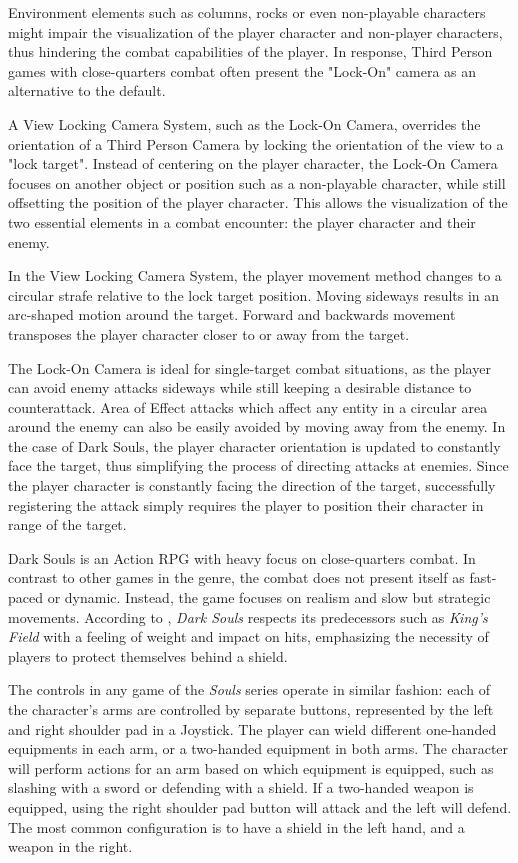 Environment elements such as columns, rocks or even non-playable characters might impair the visualization of the player character and non-player characters, thus hindering the combat capabilities of the player. In response, Third Person games with close-quarters combat often present the "Lock-On" camera as an alternative to the default.

A View Locking Camera System, such as the Lock-On Camera, overrides the orientation of a Third Person Camera by locking the orientation of the view to a "lock target". Instead of centering on the player character, the Lock-On Camera focuses on another object or position such as a non-playable character, while still offsetting the position of the player character. This allows the visualization of the two essential elements in a combat encounter: the player character and their enemy.

In the View Locking Camera System, the player movement method changes to a circular strafe relative to the lock target position. Moving sideways results in an arc-shaped motion around the target. Forward and backwards movement transposes the player character closer to or away from the target.

The Lock-On Camera is ideal for single-target combat situations, as the player can avoid enemy attacks sideways while still keeping a desirable distance to counterattack. Area of Effect attacks which affect any entity in a circular area around the enemy can also be easily avoided by moving away from the enemy. In the case of Dark Souls, the player character orientation is updated to constantly face the target, thus simplifying the process of directing attacks at enemies. Since the player character is constantly facing the direction of the target, successfully registering the attack simply requires the player to position their character in range of the target.

Dark Souls is an Action RPG with heavy focus on close-quarters combat. In contrast to other games in the genre, the combat does not present itself as fast-paced or dynamic. Instead, the game focuses on realism and slow but strategic movements. According to \cite{BOOK_DarkSoulsBeyondTheGrave}, \emph{Dark Souls} respects its predecessors such as \emph{King's Field} with a feeling of weight and impact on hits, emphasizing the necessity of players to protect themselves behind a shield.

The controls in any game of the \emph{Souls} series operate in similar fashion: each of the character's arms are controlled by separate buttons, represented by the left and right shoulder pad in a Joystick. The player can wield different one-handed equipments in each arm, or a two-handed equipment in both arms. The character will perform actions for an arm based on which equipment is equipped, such as slashing with a sword or defending with a shield. If a two-handed weapon is equipped, using the right shoulder pad button will attack and the left will defend. The most common configuration is to have a shield in the left hand, and a weapon in the right.

